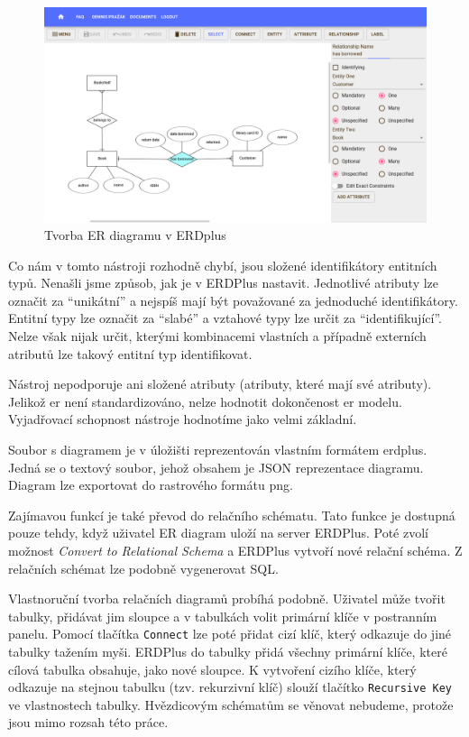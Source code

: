 \begin{figure}[!htb]
  \centering
  \includegraphics[width = \maxwidth{\textwidth}]{../img/erdplus.png}
  \caption{Tvorba ER diagramu v ERDplus}
  \label{fig:erdplus}
\end{figure}

Co nám v tomto nástroji rozhodně chybí, jsou složené identifikátory entitních typů.
Nenašli jsme způsob, jak je v ERDPlus nastavit.
Jednotlivé atributy lze označit za \enquote{unikátní} a nejspíš mají být považované za jednoduché identifikátory.
Entitní typy lze označit za \enquote{slabé} a vztahové typy lze určit za \enquote{identifikující}.
Nelze však nijak určit, kterými kombinacemi vlastních a případně externích atributů lze takový entitní typ identifikovat.

Nástroj nepodporuje ani složené atributy (atributy, které mají své atributy).
Jelikož \acrshort{er} není standardizováno, nelze hodnotit dokončenost \acrshort{er} modelu.
Vyjadřovací schopnost nástroje hodnotíme jako velmi základní.

Soubor s diagramem je v úložišti reprezentován vlastním formátem erdplus.
Jedná se o textový soubor, jehož obsahem je JSON reprezentace diagramu.
Diagram lze exportovat do rastrového formátu \acrshort{png}.

Zajímavou funkcí je také převod do relačního schématu.
Tato funkce je dostupná pouze tehdy, když uživatel ER diagram uloží na server ERDPlus.
Poté zvolí možnost \emph{Convert to Relational Schema} a ERDPlus vytvoří nové relační schéma.
Z relačních schémat lze podobně vygenerovat SQL.

Vlastnoruční tvorba relačních diagramů probíhá podobně.
Uživatel může tvořit tabulky, přidávat jim sloupce a v tabulkách volit primární klíče v postranním panelu.
Pomocí tlačítka \texttt{Connect} lze poté přidat cizí klíč, který odkazuje do jiné tabulky tažením myši.
ERDPlus do tabulky přidá všechny primární klíče, které cílová tabulka obsahuje, jako nové sloupce.
K vytvoření cizího klíče, který odkazuje na stejnou tabulku (tzv. rekurzivní klíč) slouží tlačítko \texttt{Recursive Key} ve vlastnostech tabulky.
Hvězdicovým schématům se věnovat nebudeme, protože jsou mimo rozsah této práce.

